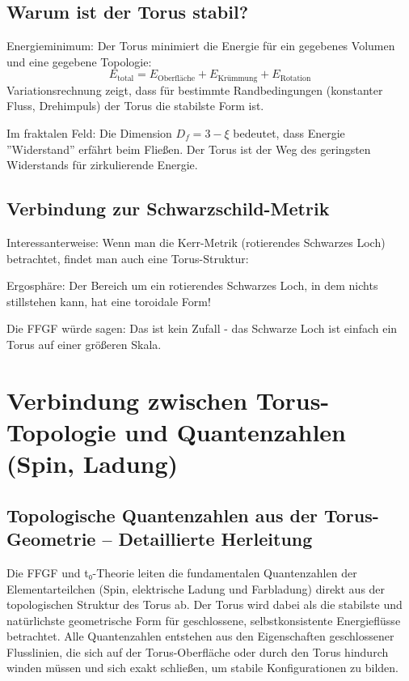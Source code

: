 	\subsection{Warum ist der Torus stabil?}
	Energieminimum:
	Der Torus minimiert die Energie für ein gegebenes Volumen und eine gegebene Topologie:
	\[
	E_{\text{total}} = E_{\text{Oberfläche}} + E_{\text{Krümmung}} + E_{\text{Rotation}}
	\]
	Variationsrechnung zeigt, dass für bestimmte Randbedingungen (konstanter Fluss, Drehimpuls) der Torus die stabilste Form ist.
	
	Im fraktalen Feld:
	Die Dimension \( D_f = 3 - \xi \) bedeutet, dass Energie ''Widerstand'' erfährt beim Fließen. Der Torus ist der Weg des geringsten Widerstands für zirkulierende Energie.
	
	\subsection{Verbindung zur Schwarzschild-Metrik}
	Interessanterweise: Wenn man die Kerr-Metrik (rotierendes Schwarzes Loch) betrachtet, findet man auch eine Torus-Struktur:
	
	Ergosphäre: Der Bereich um ein rotierendes Schwarzes Loch, in dem nichts stillstehen kann, hat eine toroidale Form!
	
	Die FFGF würde sagen: Das ist kein Zufall - das Schwarze Loch ist einfach ein Torus auf einer größeren Skala.
	
	\section{Verbindung zwischen Torus-Topologie und Quantenzahlen (Spin, Ladung)}
	
	\subsection{Topologische Quantenzahlen aus der Torus-Geometrie – Detaillierte Herleitung}
	
	Die FFGF und t₀-Theorie leiten die fundamentalen Quantenzahlen der Elementarteilchen (Spin, elektrische Ladung und Farbladung) direkt aus der topologischen Struktur des Torus ab. Der Torus wird dabei als die stabilste und natürlichste geometrische Form für geschlossene, selbstkonsistente Energieflüsse betrachtet. Alle Quantenzahlen entstehen aus den Eigenschaften geschlossener Flusslinien, die sich auf der Torus-Oberfläche oder durch den Torus hindurch winden müssen und sich exakt schließen, um stabile Konfigurationen zu bilden.
	
